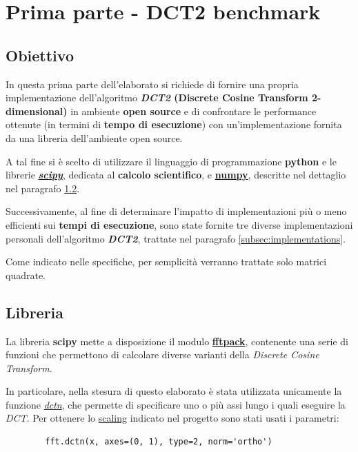 \section{Prima parte - DCT2 benchmark}
\subsection{Obiettivo}
    In questa prima parte dell'elaborato si richiede di fornire una propria implementazione dell'algoritmo \textbf{\textit{DCT2} (Discrete Cosine Transform 2-dimensional)} in ambiente \textbf{open source} e di confrontare le performance ottenute (in termini di \textbf{tempo di esecuzione}) con un'implementazione fornita da una libreria dell'ambiente open source.
    
    A tal fine si è scelto di utilizzare il linguaggio di programmazione \textbf{python} e le librerie \href{https://docs.scipy.org/doc/scipy/}{\textbf{\textit{scipy}}}, dedicata al \textbf{calcolo scientifico}, e \href{https://numpy.org/}{\textbf{numpy}}, descritte nel dettaglio nel paragrafo \ref{subsec:library}.

    Successivamente, al fine di determinare l'impatto di implementazioni più o meno efficienti sui \textbf{tempi di esecuzione}, sono state fornite tre diverse implementazioni personali dell'algoritmo \textbf{\textit{DCT2}}, trattate nel paragrafo \ref{subsec:implementations}.

    Come indicato nelle specifiche, per semplicità verranno trattate solo matrici quadrate.

\subsection{Libreria} \label{subsec:library}
    La libreria \textbf{scipy} mette a disposizione il modulo \href{https://docs.scipy.org/doc/scipy/reference/fftpack.html}{\textbf{fftpack}}, contenente una serie di funzioni che permettono di calcolare diverse varianti della \textit{Discrete Cosine Transform}.

    In particolare, nella stesura di questo elaborato è stata utilizzata unicamente la funzione \href{https://docs.scipy.org/doc/scipy/reference/generated/scipy.fftpack.dctn.html#scipy.fftpack.dctn}{\textit{dctn}}, che permette di specificare uno o più assi lungo i quali eseguire la \textit{DCT}. Per ottenere lo \href{https://docs.scipy.org/doc/scipy/reference/generated/scipy.fftpack.dct.html#scipy.fftpack.dct}{scaling} indicato nel progetto sono stati usati i parametri:
    \begin{lstlisting}
        fft.dctn(x, axes=(0, 1), type=2, norm='ortho')
    \end{lstlisting}


